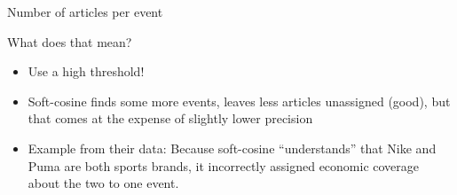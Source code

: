 \begin{frame}{Number of articles per event}
\begin{table}[h]
  \caption{Descriptives for different threshold/similarity combinations\label{tab:thresholds}}
  
  \centering
\end{table}
\end{frame}



\begin{frame}{What does that mean?}
  \begin{itemize}
  \item Use a high threshold!
  \item Soft-cosine finds some more events, leaves less articles unassigned (good), but that comes at the expense of slightly lower precision
  \item Example from their data: Because soft-cosine ``understands'' that Nike and Puma are both sports brands, it incorrectly assigned economic coverage about the two to one event.
  \end{itemize}
\end{frame}





